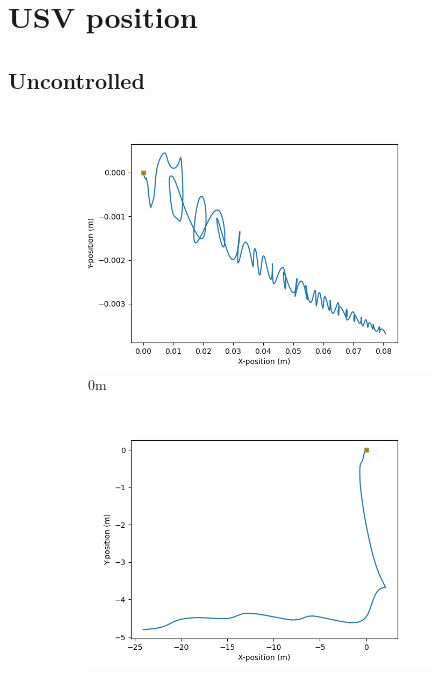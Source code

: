 \documentclass[class=article, crop=false]{standalone}
\begin{document}
\section{USV position}
\FloatBarrier
\subsection{Uncontrolled}
\begin{figure}
    \centering
    \begin{subfigure}[b]{0.48\textwidth}
        \centering
        \includegraphics{scenario1/rov-0m/0.0m/usv_position_uncontrolled}
        \caption{0m}
        \label{}
    \end{subfigure}
    \hfill
    \begin{subfigure}[b]{0.48\textwidth}
        \centering
        \includegraphics{scenario1/rov-0m/0.5m/usv_position_uncontrolled}

\end{subfigure}
\end{figure}
\end{document}
